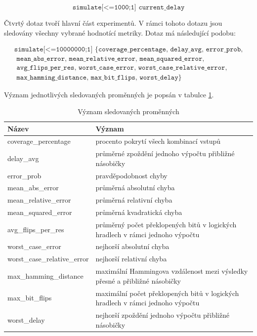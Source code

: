 \begin{equation*}
    \texttt{simulate[<=1000;1] {current\_delay}}
\end{equation*}

Čtvrtý dotaz tvoří hlavní část experimentů. V rámci tohoto dotazu jsou sledovány všechny vybrané hodnotící metriky. Dotaz má následující podobu:

\begin{equation*}
    \begin{array}{l}
        \texttt{simulate[<=10000000;1] \{coverage\_percentage, delay\_avg, error\_prob,} \\
        \texttt{    mean\_abs\_error, mean\_relative\_error, mean\_squared\_error,} \\
        \texttt{    avg\_flips\_per\_res, worst\_case\_error, worst\_case\_relative\_error,} \\
        \texttt{    max\_hamming\_distance, max\_bit\_flips, worst\_delay\}}
    \end{array}
\end{equation*}

Význam jednotlivých sledovaných proměnných je popsán v tabulce \ref{tab:var_expl}.

\begin{table}[!ht]
    \centering
    \begin{tabularx}{\textwidth}{l|X}
        \textbf{Název} & \textbf{Význam} \\ \hline
        coverage\_percentage & procento pokrytí všech kombinací vstupů \\ \hline
        delay\_avg & průměrné zpoždění jednoho výpočtu přibližné násobičky \\ \hline
        error\_prob & pravděpodobnost chyby \\ \hline
        mean\_abs\_error & průměrná absolutní chyba \\ \hline
        mean\_relative\_error & průměrná relativní chyba \\ \hline
        mean\_squared\_error & průměrná kvadratická chyba \\ \hline
        avg\_flips\_per\_res & průměrný počet překlopených bitů v logických hradlech v rámci jednoho výpočtu \\ \hline
        worst\_case\_error & nejhorší absolutní chyba \\ \hline
        worst\_case\_relative\_error & nejhorší relativní chyba \\ \hline
        max\_hamming\_distance & maximální Hammingova vzdálenost mezi výsledky přesné a přibližné násobičky \\ \hline
        max\_bit\_flips & maximální počet překlopených bitů v logických hradlech v rámci jednoho výpočtu \\ \hline
        worst\_delay & nejhorší zpoždění jednoho výpočtu přibližné násobičky \\ 
    \end{tabularx}
    \caption{Význam sledovaných proměnných}
    \label{tab:var_expl}
\end{table}

